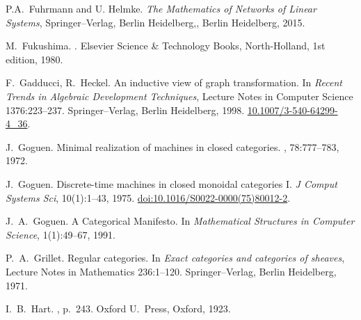 \begin{thebibliography}{RSW00}
    P.A.~Fuhrmann and U. Helmke.
    \newblock \emph{The Mathematics of Networks of Linear Systems},
    Springer--Verlag, Berlin Heidelberg,, Berlin Heidelberg, 2015. 

    M.\ Fukushima.
    .
    Elsevier Science \& Technology Books, North-Holland, 1st edition, 1980.

    F.\ Gadducci, R.\ Heckel.
    \newblock An inductive view of graph transformation.
    \newblock In {\em Recent Trends in Algebraic Development Techniques}, Lecture
    Notes in Computer Science 1376:223--237. Springer--Verlag, Berlin Heidelberg, 1998.
    \newblock \href{http://doi.org/10.1007/3-540-64299-4_36}{
    10.1007/3-540-64299-4\_36}.
    
    J.\ Goguen.
    \newblock Minimal realization of machines in closed categories.
    , 78:777--783, 1972.

    J.\ Goguen.
    \newblock Discrete-time machines in closed monoidal categories I.
    \newblock \emph{J Comput Systems Sci}, 10(1):1--43, 1975.
    \newblock
    \href{http://doi.org/10.1016/S0022-0000(75)80012-2}{doi:10.1016/S0022-0000(75)80012-2}.

    J.\ A.\ Goguen. 
    \newblock A Categorical Manifesto. 
    \newblock In {\em Mathematical Structures in Computer Science}, 1(1):49--67,
    1991.


    P.\ A.\ Grillet.
    \newblock Regular categories.
    \newblock In {\em Exact categories and categories of sheaves}, Lecture Notes in
    Mathematics 236:1--120. Springer--Verlag, Berlin Heidelberg, 1971.


    I.\ B.\ Hart.
    , p.\ 243. Oxford U.\ Press, Oxford, 1923.


\end{thebibliography}
